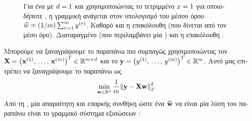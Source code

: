 {{\begin{figure}[H]
		{
		 \caption{\foreignlanguage{greek}{Για ένα}  \foreignlanguage{greek}{με $d=1$ και χρησιμοποιώντας 
		 	το τετριμμένο}  $x=1$ \foreignlanguage{greek}{για οποιοδήποτε} , 
		 	\foreignlanguage{greek}{η γραμμική}  \foreignlanguage{greek}{ανάγεται στον υπολογισμό του μέσου 
			όρου} $\widehat{w} = (1/m) \sum_{r=1}^{m} y^{(r)}$. 
			 \foreignlanguage{greek}{Καθαρό}  \foreignlanguage{greek}{και η επακόλουθη} 
			 \foreignlanguage{greek}{(που δίνεται από τον μέσο όρο}).  
			\foreignlanguage{greek}{Διαταραγμένο}  (\foreignlanguage{greek}{που περιλαμβάνει μία} 
			) \foreignlanguage{greek}{και η επακόλουθη} . \label{fig_linreg_dict}} }
		\end{figure}
		\foreignlanguage{greek}{Μπορούμε να ξαναγράψουμε το παραπάνω}  \foreignlanguage{greek}{πιο 
		συμπαγώς χρησιμοποιώντας τον}  
		${\bf X} = \big({\bf x}^{(1)},\,\ldots,\,{\bf x}^{(m)}\big)^{T} \in \mathbb{R}^{m \times d}$ 
		\foreignlanguage{greek}{και το}  
		${\bf y} = \big( y^{(1)},\,\ldots, \,y^{(m)} \big)^{T} \in \mathbb{R}^{m}$. 
		\foreignlanguage{greek}{Αυτό μας επιτρέπει να ξαναγράψουμε το παραπάνω}  \foreignlanguage{greek}{ως}
		$$\min_{\weights \in \mathbb{R}^{\nrfeatures}} \frac{1}{\samplesize} \normgeneric{\labelvec - \featuremtx \weights}{2}^{2}.$$
		\foreignlanguage{greek}{Από τη} , \foreignlanguage{greek}{μία απαραίτητη και επαρκής συνθήκη 
		ώστε ένα}  $\widehat{{\bf w}}$ \foreignlanguage{greek}{να είναι μία λύση του παραπάνω} 
		 \foreignlanguage{greek}{είναι το γραμμικό σύστημα εξισώσεων} \cite{StrangLinAlg2016}:
		\begin{equation} 
			\label{eq_linreg_normal_eq_dict}

\end{equation}}}
